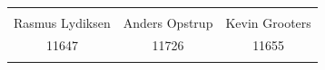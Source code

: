 \begin{center}
\vspace{2cm}

\begin{table}[H]
	\centering
		\begin{tabular}{c c c}
			\underline{\phantom{mmmmmmmmmmmmmm}} & \underline{\phantom{mmmmmmmmmmmmmm}} & \underline{\phantom{mmmmmmmmmmmmmm}} \\
			Rasmus Lydiksen			& Anders Opstrup 		& Kevin Grooters 			\\
			11647					& 11726					& 11655\\
			&&\\												
		\end{tabular}
\end{table}
\end{center}